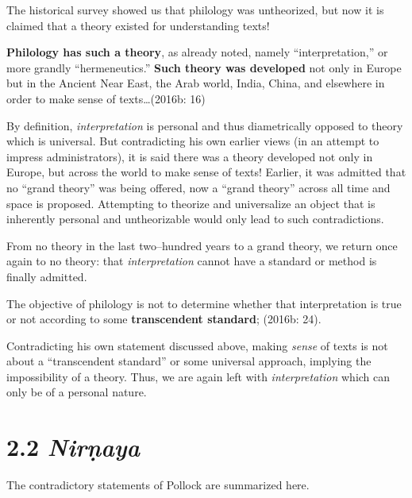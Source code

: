 The historical survey showed us that philology was untheorized, but now it is claimed that a theory existed for understanding texts!

\begin{myquote}
\textbf{Philology has such a theory}, as already noted, namely “interpretation,” or more grandly “hermeneutics.” \textbf{Such theory was developed} not only in Europe but in the Ancient Near East, the Arab world, India, China, and elsewhere in order to make sense of texts…(2016b: 16)
\end{myquote}

\newpage

By definition, \textit{interpretation} is personal and thus diametrically opposed to theory which is universal. But contradicting his own earlier views (in an attempt to impress administrators), it is said there was a theory developed not only in Europe, but across the world to make sense of texts! Earlier, it was admitted that no “grand theory” was being offered, now a “grand theory” across all time and space is proposed. Attempting to theorize and universalize an object that is inherently personal and untheorizable would only lead to such contradictions.

From no theory in the last two–hundred years to a grand theory, we return once again to no theory: that \textit{interpretation} cannot have a standard or method is finally admitted.

\begin{myquote}
The objective of philology is not to determine whether that interpretation is true or not according to some \textbf{transcendent standard}; (2016b: 24).
\end{myquote}

Contradicting his own statement discussed above, making \textit{sense} of texts is not about a “transcendent standard” or some universal approach, implying the impossibility of a theory. Thus, we are again left with \textit{interpretation} which can only be of a personal nature.

\vspace{-.3cm}

\section*{2.2 {\it {\bfseries Nirṇaya}}}

The contradictory statements of Pollock are summarized here.

